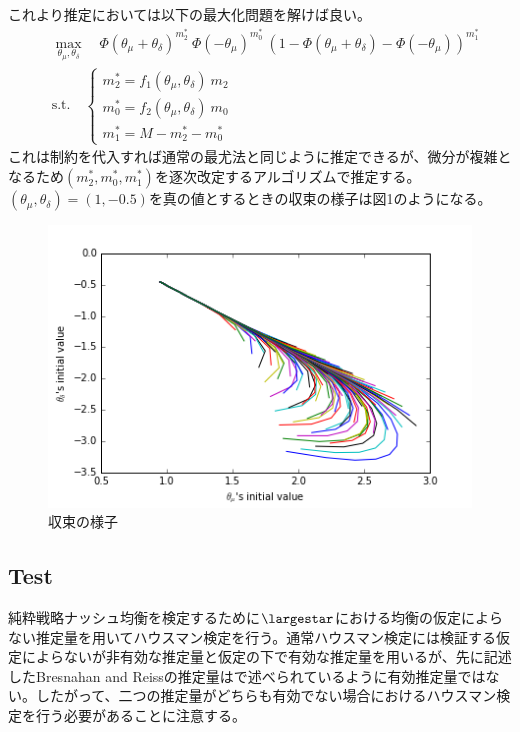 \documentclass{jsarticle}
\begin{document}
これより推定においては以下の最大化問題を解けば良い。
\begin{align*}
	&\max_{\theta_{\mu}, \theta_{\delta}}\quad \Phi(\theta_{\mu}+\theta_{\delta})^{m_2^{*}}\ \Phi(-\theta_{\mu})^{m_0^{*}}\  (1- \Phi(\theta_{\mu}+\theta_{\delta}) - \Phi(-\theta_{\mu}))^{m_1^{*}}\\
	&\text{s.t.}\quad \begin{cases}
	m_2^{*} = f_1(\theta_{\mu}, \theta_{\delta})\ m_2\\
	m_0^{*} = f_2(\theta_{\mu}, \theta_{\delta})\ m_0\\
	m_1^{*} = M - m_2^{*} - m_0^{*}
	\end{cases}
\end{align*}
これは制約を代入すれば通常の最尤法と同じように推定できるが、微分が複雑となるため$(m_2^{*},m_0^{*},m_1^{*})$を逐次改定するアルゴリズムで推定する。$(\theta_{\mu}, \theta_{\delta}) = (1, -0.5)$を真の値とするときの収束の様子は図1のようになる。
\begin{figure}[h]
\centering
\includegraphics{conversion.png}
\caption{収束の様子}
\end{figure}

\subsection{Test}
純粋戦略ナッシュ均衡を検定するために$\largestar$における均衡の仮定によらない推定量を用いてハウスマン検定を行う。通常ハウスマン検定には検証する仮定によらないが非有効な推定量と仮定の下で有効な推定量を用いるが、先に記述したBresnahan and Reissの推定量は\cite{3}で述べられているように有効推定量ではない。したがって、二つの推定量がどちらも有効でない場合におけるハウスマン検定を行う必要があることに注意する。
\end{document}
